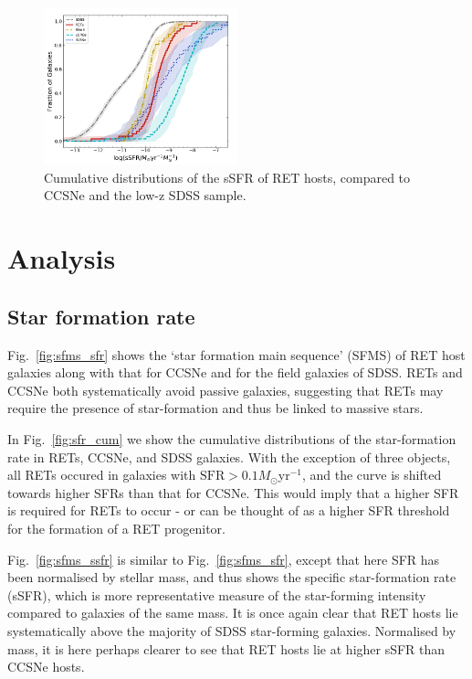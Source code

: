 \documentclass[fleqn,usenatbib,]{mnras}
\newcommand{\msun}[0]{M_{\odot}}
\begin{document}
\begin{figure}
\includegraphics[width=0.5\textwidth]{figs/cum_sSFR_mike.png}
\caption{Cumulative distributions of the sSFR of RET hosts, compared to CCSNe and the low-z SDSS sample.
\label{fig:ssfr_cum}}
\end{figure}

\section{Analysis}
\label{sec:analysis} %

\subsection{Star formation rate \label{subsec:res_sfr}}
Fig.~\ref{fig:sfms_sfr} shows the `star formation main sequence' (SFMS) of RET host galaxies along with that for CCSNe and for the field galaxies of SDSS. RETs and CCSNe both systematically avoid passive galaxies, suggesting that RETs may require the presence of star-formation and thus be linked to massive stars.

In Fig.~\ref{fig:sfr_cum} we show the cumulative distributions of the star-formation rate in RETs, CCSNe, and SDSS galaxies. With the exception of three objects, all RETs occured in galaxies with $\textrm{SFR}>0.1 \msun$yr$^{-1}$, and the curve is shifted towards higher SFRs than that for CCSNe. This would imply that a higher SFR is required for RETs to occur - or can be thought of as a higher SFR threshold for the formation of a RET progenitor.

Fig.~\ref{fig:sfms_ssfr} is similar to Fig.~\ref{fig:sfms_sfr}, except that here SFR has been normalised by stellar mass, and thus shows the specific star-formation rate (sSFR), which is more representative measure of the star-forming intensity compared to galaxies of the same mass. It is once again clear that RET hosts lie systematically above the majority of SDSS star-forming galaxies. Normalised by mass, it is here perhaps clearer to see that RET hosts lie at higher sSFR than CCSNe hosts.
\end{document}
